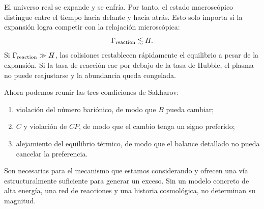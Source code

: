 El universo real se expande y se enfría. Por tanto, el estado macroscópico distingue entre el tiempo hacia delante y hacia atrás. Esto solo importa si la expansión logra competir con la relajación microscópica:
\begin{equation}
\Gamma_{\rm reaction}\lesssim H.
\label{eq:c08-freezeout-condition}
\end{equation}
Si \(\Gamma_{\rm reaction}\gg H\), las colisiones restablecen rápidamente el equilibrio a pesar de la expansión. Si la tasa de reacción cae por debajo de la tasa de Hubble, el plasma no puede reajustarse y la abundancia queda congelada.

\begin{classroomqa}
\end{classroomqa}

Ahora podemos reunir las tres condiciones de Sakharov:
\begin{enumerate}
\item violación del número bariónico, de modo que \(B\) pueda cambiar;
\item \(C\) y violación de \(CP\), de modo que el cambio tenga un signo preferido;
\item alejamiento del equilibrio térmico, de modo que el balance detallado no pueda cancelar la preferencia.
\end{enumerate}
Son necesarias para el mecanismo que estamos considerando y ofrecen una vía estructuralmente suficiente para generar un exceso. Sin un modelo concreto de alta energía, una red de reacciones y una historia cosmológica, no determinan su magnitud.

\begin{classroomqa}
\end{classroomqa}

